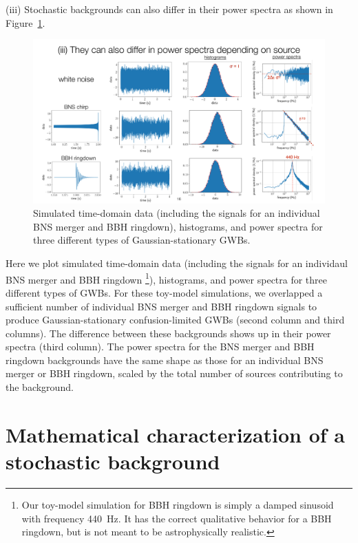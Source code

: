 \documentclass[11pt]{article}
\numberwithin{equation}{section}
\begin{document}
(iii) Stochastic backgrounds can also differ in their power 
spectra as shown in Figure~\ref{f:different_power_spectra}.
%
\begin{figure}[htbp!]
\begin{center}
\includegraphics[width=\textwidth]{Figures/different_power_spectra}
\caption{Simulated time-domain data (including the signals for an
individual BNS merger and BBH ringdown), histograms, and power spectra
for three different types of Gaussian-stationary GWBs.}
\label{f:different_power_spectra}
\end{center}
\end{figure}
%
Here we plot simulated time-domain data (including the signals for an
individaul BNS merger and BBH ringdown%
\footnote{Our toy-model simulation for BBH ringdown is simply a 
damped sinusoid with frequency 440~Hz.
It has the correct qualitative behavior for a BBH ringdown, but 
is not meant to be astrophysically realistic.}), 
histograms, and power spectra
for three different types of GWBs.
For these toy-model simulations, we overlapped a sufficient number of 
individual BNS merger and BBH ringdown signals to produce 
Gaussian-stationary confusion-limited GWBs
(second column and third columns).
The difference between these backgrounds shows up in their power 
spectra (third column).
The power spectra for the BNS merger and BBH ringdown backgrounds 
have the same shape as those for an individual BNS merger or 
BBH ringdown, scaled by the total number of sources contributing 
to the background.

\section{Mathematical characterization of a stochastic background}
\end{document}

